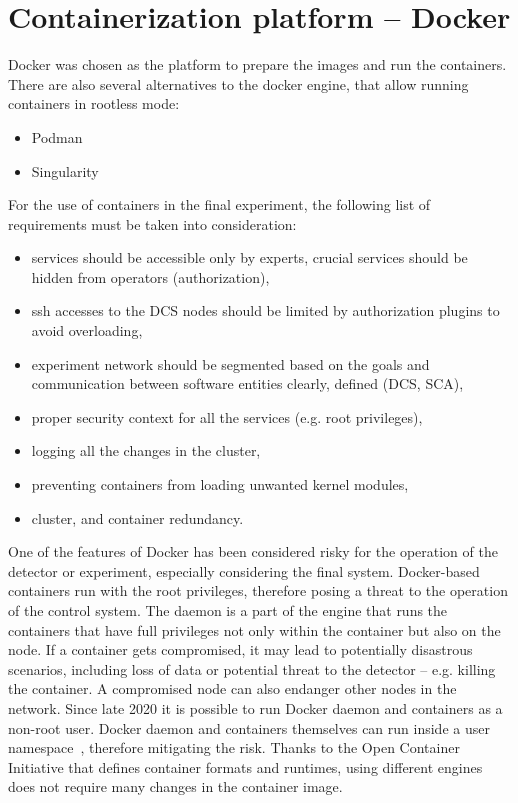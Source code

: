 \section{Containerization platform -- Docker}
Docker was chosen as the platform to prepare the images and run the containers. There are also several alternatives to the docker engine, that allow running containers in rootless mode:
\begin{itemize}
    \item Podman~\cite{Podman} 
    \item Singularity~\cite{singularity}
\end{itemize}

For the use of containers in the final experiment, the following list of requirements must be taken into consideration:

\begin{itemize}
    \item services should be accessible only by experts, crucial services should be hidden from operators (authorization),
    \item ssh accesses to the DCS nodes should be limited by authorization plugins to avoid overloading,
    \item experiment network should be segmented based on the goals and communication between software entities clearly, defined (\gls{DCS}, \gls{SCA}),
    \item proper security context for all the services (e.g. root privileges),
    \item logging all the changes in the cluster,
    \item preventing containers from loading unwanted kernel modules,
    \item cluster, and container redundancy.
\end{itemize}


One of the features of Docker has been considered risky for the operation of the detector or experiment, especially considering the final system. Docker-based containers run with the root privileges, therefore posing a threat to the operation of the control system. The daemon is a part of the engine that runs the containers that have full privileges not only within the container but also on the node. If a container gets compromised, it may lead to potentially disastrous scenarios, including loss of data or potential threat to the detector -- e.g. killing the container. A compromised node can also endanger other nodes in the network.  Since late 2020 it is possible to run Docker daemon and containers as a non-root user. Docker daemon and containers themselves can run inside a user namespace~\cite{docker_limitations}, therefore mitigating the risk.
 Thanks to the Open Container Initiative that defines container formats and runtimes, using different engines does not require many changes in the container image. 

